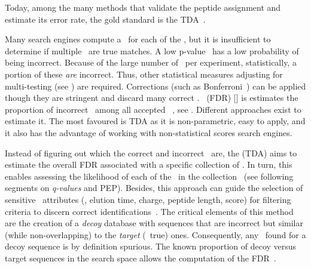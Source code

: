 
Today, among the many methods that validate the peptide assignment and
estimate its error rate,
the gold standard is the \gls{TDA}~.

Many search engines compute a \pval\ for each of the \psms,
but it is insufficient to determine if multiple \psms\ are true matches.
A low p-value \psm\ has a low probability of being incorrect.
Because of the large number of \psms\ per experiment,
statistically, a portion of these \emph{are} incorrect.
Thus, other statistical measures
adjusting for multi-testing (see )
are required.
Corrections (such as Bonferroni~) can be applied
though they are stringent and discard many correct \psms.
~(\gls{FDR}) $[$\citet*{Benjamini1995-nf}$]$ is
estimates the proportion of incorrect \psms\
among all accepted \psms~,
see \Cref{eq:fdr-prot}.
Different approaches exist to estimate it.
The most favoured is \gls{TDA}
as it is non-parametric, easy to apply, and
it also has the advantage of working with non-statistical scores search engines.

Instead of figuring out which the correct and incorrect \psms\ are,
the \glsentrydesc{TDA} (\gls{TDA}) aims to estimate
the overall \gls{FDR} associated with a specific collection of \psms.
In turn, this enables assessing the likelihood of each of the \psms\
in the collection~
(see following segments on \emph{q-values} and \gls{PEP}).
Besides, this approach can guide
the selection of sensitive \psm\ attributes
(\eg, elution time, charge, peptide length, score)
for filtering criteria to discern correct identifications~.
The critical elements of this method are
the creation of a \emph{decoy} database with sequences
that are incorrect but similar (while non-overlapping)
to the \emph{target} (\ie\ true) ones.
Consequently, any \psm\ found for a decoy sequence is by definition spurious.
The known proportion of decoy versus target sequences in the search space allows
the computation of the \gls{FDR}~\mycite{Elias2007-wi,Elias2010-kp}.
\vspace{-9mm}

